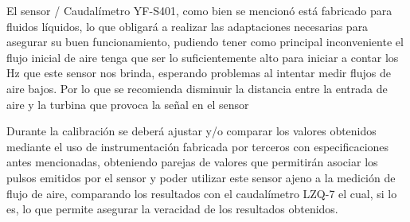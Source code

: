 \documentclass[11pt,letter
								]
								{article}
\begin{document}
	El sensor / Caudalímetro  YF-S401, como bien se mencionó está fabricado para fluidos líquidos, lo que obligará  a realizar las adaptaciones necesarias para asegurar su buen funcionamiento, pudiendo tener  como principal inconveniente  el flujo inicial de aire tenga que ser lo suficientemente alto para iniciar a contar los Hz que este sensor nos brinda, esperando problemas al intentar medir flujos de aire bajos. %
Por lo que se recomienda disminuir la distancia entre la entrada de aire  y la turbina  que provoca la señal en el sensor %

	Durante la calibración  se deberá  ajustar y/o comparar  los valores obtenidos mediante el uso de instrumentación fabricada por terceros  con especificaciones antes mencionadas, obteniendo parejas de valores que permitirán  asociar los pulsos emitidos por el sensor  y poder utilizar este sensor ajeno a la medición de flujo de aire, comparando los resultados con el  caudalímetro LZQ-7 el cual, si lo es, lo  que permite asegurar la veracidad de los resultados obtenidos.\\


\end{document}
